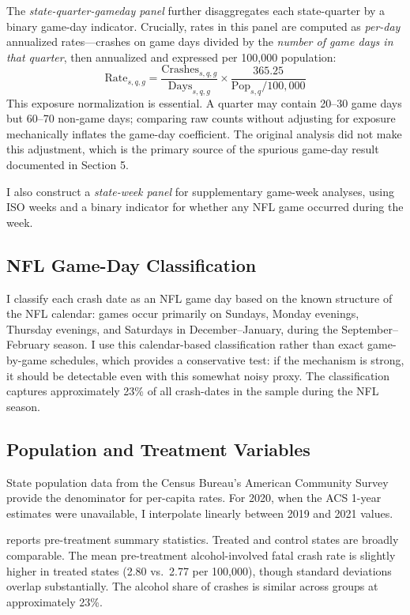 \documentclass[12pt]{article}
\begin{document}
The \textit{state-quarter-gameday panel} further disaggregates each state-quarter by a binary game-day indicator. Crucially, rates in this panel are computed as \textit{per-day} annualized rates---crashes on game days divided by the \textit{number of game days in that quarter}, then annualized and expressed per 100,000 population:
\begin{equation}
\text{Rate}_{s,q,g} = \frac{\text{Crashes}_{s,q,g}}{\text{Days}_{s,q,g}} \times \frac{365.25}{\text{Pop}_{s,q}/100{,}000}
\end{equation}
This exposure normalization is essential. A quarter may contain 20--30 game days but 60--70 non-game days; comparing raw counts without adjusting for exposure mechanically inflates the game-day coefficient. The original analysis did not make this adjustment, which is the primary source of the spurious game-day result documented in Section 5.

I also construct a \textit{state-week panel} for supplementary game-week analyses, using ISO weeks and a binary indicator for whether any NFL game occurred during the week.

\subsection{NFL Game-Day Classification}

I classify each crash date as an NFL game day based on the known structure of the NFL calendar: games occur primarily on Sundays, Monday evenings, Thursday evenings, and Saturdays in December--January, during the September--February season. I use this calendar-based classification rather than exact game-by-game schedules, which provides a conservative test: if the mechanism is strong, it should be detectable even with this somewhat noisy proxy. The classification captures approximately 23\% of all crash-dates in the sample during the NFL season.

\subsection{Population and Treatment Variables}

State population data from the Census Bureau's American Community Survey provide the denominator for per-capita rates. For 2020, when the ACS 1-year estimates were unavailable, I interpolate linearly between 2019 and 2021 values.



 reports pre-treatment summary statistics. Treated and control states are broadly comparable. The mean pre-treatment alcohol-involved fatal crash rate is slightly higher in treated states (2.80 vs.\ 2.77 per 100,000), though standard deviations overlap substantially. The alcohol share of crashes is similar across groups at approximately 23\%.
\end{document}
